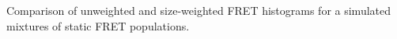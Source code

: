 \label{fig:weight_fret_sim} Comparison of unweighted and size-weighted FRET histograms for a simulated mixtures of static FRET populations.